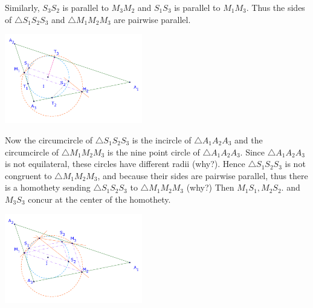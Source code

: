 \documentclass[8pt,xcolor=table,dvipsnames]{beamer}
\begin{document}
\begin{frame}[t]
\begin{overprint}
        Similarly, $S_3S_2$ is parallel to $M_3M_2$ and $S_1S_3$ is parallel to $M_1M_3.$
        \bigbreak
        Thus the sides of $\triangle S_1S_2S_3$ and $\triangle M_1M_2M_3$ are pairwise parallel.
        \begin{center}
            \includegraphics[width=6cm]{./svg/pdf/homothety-p8d.pdf}
        \end{center}
        Now the circumcircle of $\triangle S_1S_2S_3$ is the incircle of $\triangle A_1A_2A_3$ 
        and the circumcircle of $\triangle M_1M_2M_3$ is the nine point circle of $\triangle A_1A_2A_3$.
        \bigbreak
        Since $\triangle A_1A_2A_3$ is not equilateral, these circles have different radii (why?).
        \bigbreak
        Hence $\triangle S_1S_2S_3$ is not congruent to $\triangle M_1M_2M_3$, and because their sides are pairwise parallel,
        thus there is a homothety sending $\triangle S_1S_2S_3$ to $\triangle M_1M_2M_3$ (why?)
        \bigbreak
        Then $M_1S_1, M_2S_2$. and $M_3S_3$ concur at the center of the homothety.
        \begin{center}
            \includegraphics[width=6cm]{./svg/pdf/homothety-p8c.pdf}
        \end{center}
    \end{overprint}
\end{frame}
\end{document}
